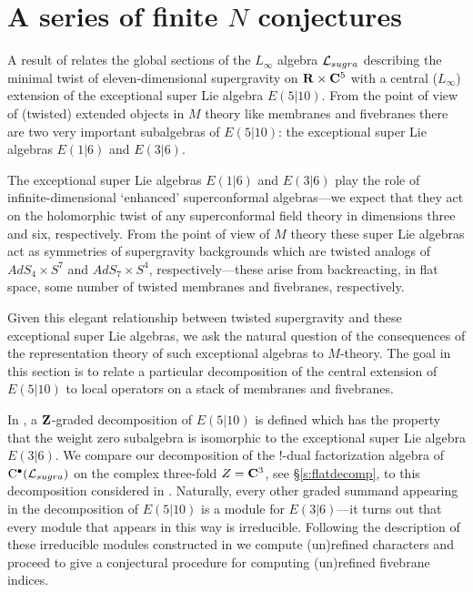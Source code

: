 %
%
%

\section{A series of finite $N$ conjectures}
\label{s:kr}

A result of \cite{RSW} relates the global sections of the $L_\infty$ algebra $\mathcal L_{sugra}$ describing the minimal twist of eleven-dimensional supergravity on $\mathbf{R} \times \mathbf{C}^5$ with a central ($L_\infty$) extension of the exceptional super Lie algebra $E(5|10)$.
From the point of view of (twisted) extended objects in $M$ theory like membranes and fivebranes there are two very important subalgebras of $E(5|10)$: the exceptional super Lie algebras $E(1|6)$ and $E(3|6)$. 

The exceptional super Lie algebras $E(1|6)$ and $E(3|6)$ play the role of infinite-dimensional `enhanced' superconformal algebras---we expect that they act on the holomorphic twist of any superconformal field theory in dimensions three and six, respectively.
From the point of view of $M$ theory these super Lie algebras act as symmetries of supergravity backgrounds which are twisted analogs of $AdS_4 \times S^7$ and $AdS_7 \times S^4$, respectively---these arise from backreacting, in flat space, some number of twisted membranes and fivebranes, respectively. 

Given this elegant relationship between twisted supergravity and these exceptional super Lie algebras, we ask the natural question of the consequences of the representation theory of such exceptional algebras to $M$-theory. 
The goal in this section is to relate a particular decomposition of the central extension of $E(5|10)$ to local operators on a stack of membranes and fivebranes.

In \cite{KR2}, a $\mathbf{Z}$-graded decomposition of $E(5|10)$ is defined which has the property that the weight zero subalgebra is isomorphic to the exceptional super Lie algebra $E(3|6)$.
We compare our decomposition of the $!$-dual factorization algebra of ${\rm C}^\bullet(\mathcal L_{sugra})$ on the complex three-fold $Z = \mathbf{C}^3$, see \S \ref{s:flatdecomp}, to this decomposition considered in \cite{KR2}.
Naturally, every other graded summand appearing in the decomposition of $E(5|10)$ is a module for $E(3|6)$---it turns out that every module that appears in this way is irreducible.
Following the description of these irreducible modules constructed in \cite{KR1,KR2} we compute (un)refined characters and proceed to give a conjectural procedure for computing (un)refined fivebrane indices.

